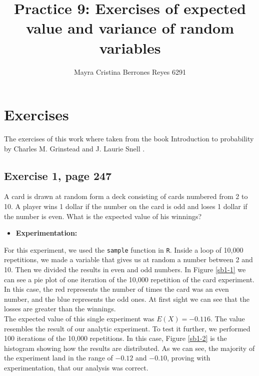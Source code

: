 \documentclass{article}
\begin{document}
\title{%
  Practice 9: Exercises of expected value and variance of random variables} %
\author{Mayra Cristina Berrones Reyes 6291}

\maketitle

\section{Exercises}

The exercises of this work where taken from the book Introduction to probability by Charles M. Grinstead and J. Laurie Snell \cite{grin}.

\subsection{Exercise 1, page 247}\label{ex1}

A card is drawn at random form a deck consisting of cards numbered from 2 to 10. A player wins 1 dollar if the number on the card is odd and loses 1 dollar if the number is even. What is the expected value of his winnings?\\

\begin{itemize}
\item \textbf{Experimentation:}
\end{itemize}

For this experiment, we used the \texttt{sample} function in \texttt{R}. Inside a loop of 10,000 repetitions, we made a variable that gives us at random a number between 2 and 10. Then we divided the results in even and odd numbers. In Figure \ref{sb1-1} we can see a pie plot of one iteration of the 10,000 repetition of the card experiment. In this case, the red represents the number of times the card was an even number, and the blue represents the odd ones. At first sight we can see that the losses are greater than the winnings. \\

The expected value of this single experiment was $E(X) = -0.116$. The value resembles the result of our analytic experiment. To test it further, we performed 100 iterations of the 10,000 repetitions. In this case, Figure \ref{sb1-2} is the histogram showing how the results are distributed. As we can see, the majority of the experiment land in the range of $-0.12$ and $-0.10$, proving with experimentation, that our analysis was correct.\\
\end{document}
